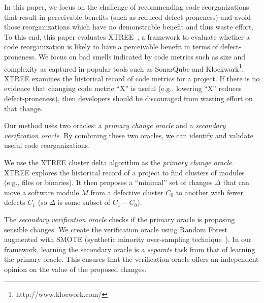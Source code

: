 \documentclass[twocolumn,5p]{elsarticle}
\theoremstyle{break}
\begin{document}
	 In this 
	paper, we focus on the challenge of recommending code reorganizations that 
	result in perceivable benefits (such as reduced defect proneness) and avoid 
	those reorganizations which have no demonstrable benefit and thus waste 
	effort.
	 To this end, this
	paper evaluates XTREE~\cite{krishna2015actionable}, a framework to evaluate 
	whether a code reorganization is likely to have a perceivable benefit in 
	terms of defect-proneness. We focus on bad smells indicated by code 
	metrics 
	such as size and complexity as captured in popular tools such as SonarQube 
	and Klockwork\footnote{http://www.klocwork.com/}.
	XTREE examines the historical record of code metrics for a project. If 
	there is no evidence that changing code metric ``X'' is useful (e.g., 
	lowering ``X'' reduces defect-proneness), then developers should be 
	discouraged from wasting effort on that change.
	
	Our method uses two oracles: a {\em primary
		change oracle} and a {\em secondary verification oracle}.
	By combining these two oracles,
	we can identify and validate useful
	code reorganizations.
	
	We use
	the XTREE cluster delta algorithm as the {\em primary change  oracle}.
	XTREE
	explores the historical record of a project to find clusters of modules 
	(e.g., files or binaries).
	It then proposes a ``minimal'' set of changes $\Delta$ that can move a 
	software module $M$ from a defective cluster $C_0$ to another with fewer 
	defects $C_1$ (so $\Delta$
	is some subset of $C_1 - C_0$). %
	
	The {\em secondary verification oracle} checks if the primary oracle is 
	proposing
	sensible changes. We create the verification oracle using Random 
	Forest~\cite{Breiman2001} augmented with SMOTE (synthetic  minority 
	over-sampling technique~\cite{chawla2002smote}).
	In our framework,  learning
	the secondary oracle is   a {\em separate} task from that of learning the 
	primary
	oracle. This  ensures that the verification oracle offers an independent
	opinion on the value of the proposed changes.
	
\end{document}
